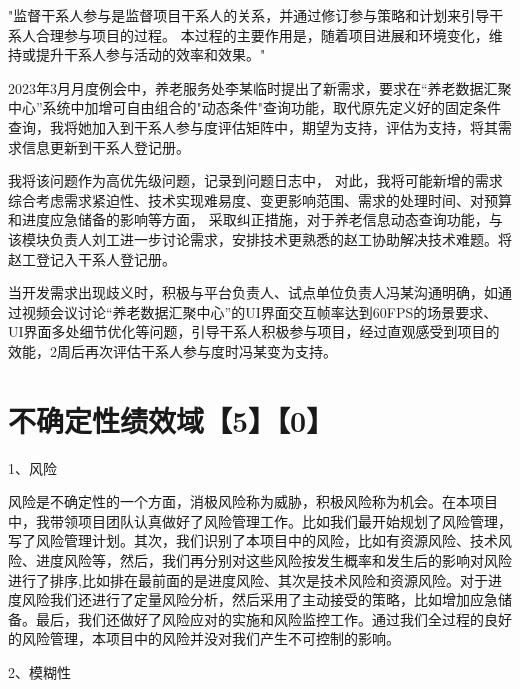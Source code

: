 \documentclass[UTF8]{../computerUniverse}
\begin{document}
"监督干系人参与是监督项目干系人的关系，并通过修订参与策略和计划来引导干系人合理参与项目的过程。
本过程的主要作用是，随着项目进展和环境变化，维持或提升干系人参与活动的效率和效果。"

2023年3月月度例会中，养老服务处李某临时提出了新需求，要求在“养老数据汇聚中心”系统中加增可自由组合的"动态条件"查询功能，取代原先定义好的固定条件查询，我将她加入到干系人参与度评估矩阵中，期望为支持，评估为支持，将其需求信息更新到干系人登记册。

我将该问题作为高优先级问题，记录到问题日志中，
对此，我将可能新增的需求综合考虑需求紧迫性、技术实现难易度、变更影响范围、需求的处理时间、对预算和进度应急储备的影响等方面，
采取纠正措施，对于养老信息动态查询功能，与该模块负责人刘工进一步讨论需求，安排技术更熟悉的赵工协助解决技术难题。将赵工登记入干系人登记册。

当开发需求出现歧义时，积极与平台负责人、试点单位负责人冯某沟通明确，如通过视频会议讨论“养老数据汇聚中心”的UI界面交互帧率达到60FPS的场景要求、UI界面多处细节优化等问题，引导干系人积极参与项目，经过直观感受到项目的效能，2周后再次评估干系人参与度时冯某变为支持。










\chapter{不确定性绩效域【5】【0】}




1、风险

风险是不确定性的一个方面，消极风险称为威胁，积极风险称为机会。在本项目中，我带领项目团队认真做好了风险管理工作。比如我们最开始规划了风险管理，写了风险管理计划。其次，我们识别了本项目中的风险，比如有资源风险、技术风险、进度风险等，然后，我们再分别对这些风险按发生概率和发生后的影响对风险进行了排序,比如排在最前面的是进度风险、其次是技术风险和资源风险。对于进度风险我们还进行了定量风险分析，然后采用了主动接受的策略，比如增加应急储备。最后，我们还做好了风险应对的实施和风险监控工作。通过我们全过程的良好的风险管理，本项目中的风险并没对我们产生不可控制的影响。



2、模糊性
\end{document}
